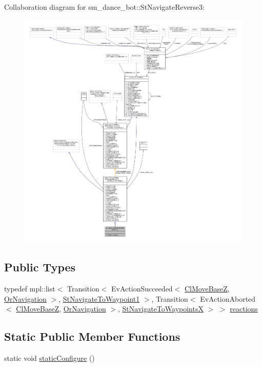 Collaboration diagram for sm\+\_\+dance\+\_\+bot\+:\+:St\+Navigate\+Reverse3\+:
\nopagebreak
\begin{figure}[H]
\begin{center}
\leavevmode
\includegraphics[width=350pt]{structsm__dance__bot_1_1StNavigateReverse3__coll__graph}
\end{center}
\end{figure}
\subsection*{Public Types}
\begin{DoxyCompactItemize}
\item 
typedef mpl\+::list$<$ Transition$<$ Ev\+Action\+Succeeded$<$ \hyperlink{classmove__base__z__client_1_1ClMoveBaseZ}{Cl\+Move\+BaseZ}, \hyperlink{classsm__dance__bot_1_1OrNavigation}{Or\+Navigation} $>$, \hyperlink{structsm__dance__bot_1_1StNavigateToWaypoint1}{St\+Navigate\+To\+Waypoint1} $>$, Transition$<$ Ev\+Action\+Aborted$<$ \hyperlink{classmove__base__z__client_1_1ClMoveBaseZ}{Cl\+Move\+BaseZ}, \hyperlink{classsm__dance__bot_1_1OrNavigation}{Or\+Navigation} $>$, \hyperlink{structsm__dance__bot_1_1StNavigateToWaypointsX}{St\+Navigate\+To\+WaypointsX} $>$ $>$ \hyperlink{structsm__dance__bot_1_1StNavigateReverse3_ab55c811a489098c4f9fb1cd8db2da32f}{reactions}
\end{DoxyCompactItemize}
\subsection*{Static Public Member Functions}
\begin{DoxyCompactItemize}
\item 
static void \hyperlink{structsm__dance__bot_1_1StNavigateReverse3_a01fcc1e52c2bc616febfc19c01c72612}{static\+Configure} ()
\end{DoxyCompactItemize}
